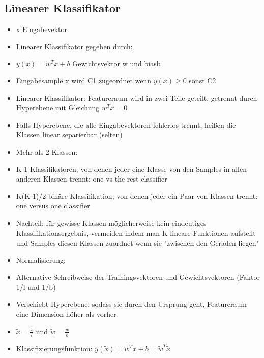 \documentclass[a4paper,10pt,oneside]{article}
\begin{document}
\subsection{Linearer Klassifikator}
\begin{itemize}
	\item x Eingabevektor
	\item Linearer Klassifikator gegeben durch:
	\item $y(x) = w^Tx+b$ Gewichtsvektor w und biasb
	\item Eingabesample x wird C1 zugeordnet wenn $y(x) \ge 0$ sonst C2
	\item Linearer Klassifikator: Featureraum wird in zwei Teile geteilt, getrennt durch Hyperebene mit Gleichung $w^Tx = 0$
	\item Falls Hyperebene, die alle Eingabevektoren fehlerlos trennt, heißen die Klassen linear separierbar (selten)
	\item Mehr als 2 Klassen:
	\item K-1 Klassifikatoren, von denen jeder eine Klasse von den Samples in allen anderen Klassen trennt: one vs the rest classifier
	\item K(K-1)/2 binäre Klassifikation, von denen jeder ein Paar von Klassen trennt: one versus one classifier
	\item Nachteil: für gewisse Klassen möglicherweise kein eindeutiges Klassifikationsergebnis, vermeiden indem man K lineare Funktionen aufstellt und Samples diesen Klassen zuordnet wenn sie "zwischen den Geraden liegen"
	\item Normalisierung:
	\item Alternative Schreibweise der Trainingsvektoren und Gewichtsvektoren (Faktor 1/l und 1/b)
	\item Verschiebt Hyperebene, sodass sie durch den Ursprung geht, Featureraum eine Dimension höher als vorher
	\item $\tilde{x}= \frac{x}{l}$ und $\tilde{w}=\frac{w}{b}$ 
	\item Klassifizierungsfunktion: $y(\tilde{x}) = w^Tx+b=\tilde{w}^T\tilde{x}$
\end{itemize}
\end{document}
